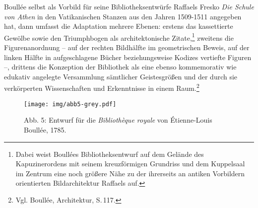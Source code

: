 Boullée selbst als Vorbild für seine Bibliotheksentwürfe Raffaels Fresko
\emph{Die Schule von Athen} in den Vatikanischen Stanzen aus den Jahren
1509-1511 angegeben hat, dann umfasst die Adaptation mehrere Ebenen:
erstens das kassettierte Gewölbe sowie den Triumphbogen als
architektonische Zitate,\footnote{Dabei weist Boullées
  Bibliotheksentwurf auf dem Gelände des Kapuzinerordens mit seinem
  kreuzförmigen Grundriss und dem Kuppelsaal im Zentrum eine noch
  größere Nähe zu der ihrerseits an antiken Vorbildern orientierten
  Bildarchitektur Raffaels auf.} zweitens die Figurenanordnung -- auf
der rechten Bildhälfte im geometrischen Beweis, auf der linken Hälfte in
aufgeschlagene Bücher beziehungsweise Kodizes vertiefte Figuren --, drittens die
Konzeption der Bibliothek als eine ebenso kommemorativ wie edukativ
angelegte Versammlung sämtlicher Geistesgrößen und der durch sie
verkörperten Wissenschaften und Erkenntnisse in einem Raum.\footnote{Vgl.
  Boullée, Architektur, S.\,117.}

\begin{figure}[htbp]
\centering
\texttt{[image: img/abb5-grey.pdf]}
\caption*{Abb. 5: Entwurf für die \emph{Bibliothèque royale} von
Étienne-Louis Boullée, 1785.}
\end{figure}

